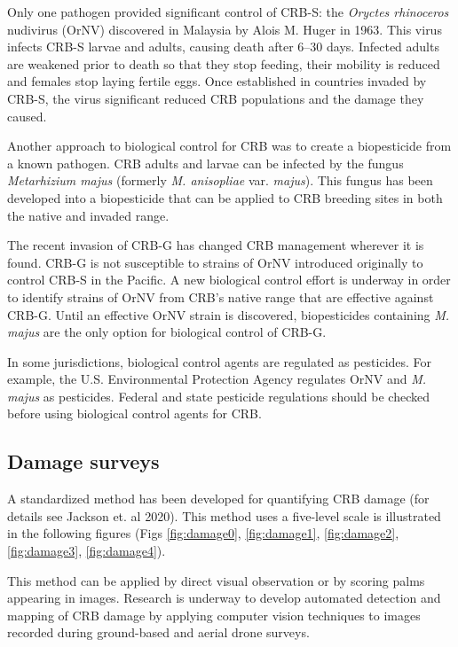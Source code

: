 \documentclass[twocolumn,letterpaper]{scrartcl}
\begin{document}
Only one pathogen provided significant control of CRB-S: the \textit{Oryctes rhinoceros} nudivirus (OrNV) discovered in Malaysia by Alois M. Huger in 1963. This virus infects CRB-S larvae and adults, causing death after 6–30 days. Infected adults are weakened prior to death so that they stop feeding, their mobility is reduced and females stop laying fertile eggs. Once established in countries invaded by CRB-S, the virus significant reduced CRB populations and the damage they caused. 

Another approach to biological control for CRB was to create a biopesticide from a known pathogen. CRB adults and larvae can be infected by the fungus \textit{Metarhizium majus} (formerly \textit{M. anisopliae} var. \textit{majus}). This fungus has been developed into 
a biopesticide that can be applied to CRB breeding sites in both the native and invaded range. 

The recent invasion of CRB-G has changed CRB management wherever it is found. CRB-G is not susceptible to strains of OrNV introduced originally to control CRB-S in the Pacific. A new biological control effort is underway in order to identify strains of OrNV from CRB’s native range that are effective against CRB-G. Until an effective OrNV strain is discovered, biopesticides containing \textit{M. majus} are the only option for biological control of CRB-G.

In some jurisdictions, biological control agents are regulated as pesticides. For example, the U.S. Environmental Protection Agency regulates OrNV and \textit{M. majus} as pesticides. Federal and state pesticide regulations should be checked before using biological control agents for CRB. 

\subsection{Damage surveys}

A standardized method has been developed for quantifying CRB damage (for details see Jackson et. al 2020). This method uses a five-level scale is illustrated in the following figures (Figs \ref{fig:damage0}, \ref{fig:damage1}, \ref{fig:damage2}, \ref{fig:damage3}, \ref{fig:damage4}). 

This method can be applied by direct visual observation or by scoring palms appearing in images. Research is underway to develop automated detection and mapping of CRB damage by applying computer vision techniques to images recorded during ground-based and aerial drone surveys. 
\end{document}
